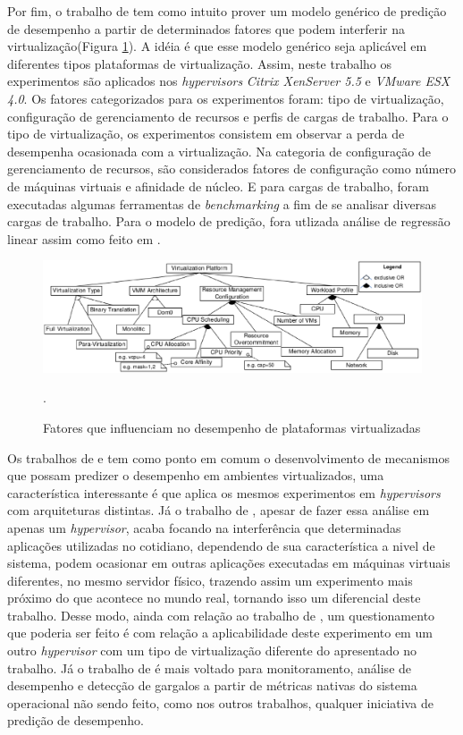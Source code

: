Por fim, o trabalho de  tem como intuito prover um modelo genérico de predição de desempenho a partir de determinados fatores que podem interferir na virtualização(Figura \ref{influence_factors}). A idéia é que esse modelo genérico seja aplicável em diferentes tipos plataformas de virtualização. Assim, neste trabalho os experimentos são aplicados nos \textit{hypervisors } \textit{Citrix XenServer 5.5} e \textit{VMware ESX 4.0}. Os fatores categorizados para os experimentos foram: tipo de virtualização, configuração de gerenciamento de recursos e perfis de cargas de trabalho. Para o tipo de virtualização, os experimentos consistem em observar a perda de desempenha ocasionada com a virtualização. Na categoria de configuração de gerenciamento de recursos, são considerados fatores de configuração como número de máquinas virtuais e afinidade de núcleo. E para cargas de trabalho, foram executadas algumas ferramentas de \textit{benchmarking} a fim de se analisar diversas cargas de trabalho. Para o modelo de predição, fora utlizada análise de regressão linear assim como feito em .

\begin{figure}[!htb]
\centering
\includegraphics [keepaspectratio=true,scale=0.50]{figuras/factors_influence.eps}
\caption{Fatores que influenciam no desempenho de plataformas virtualizadas}
\cite{huber2011}.
\label{influence_factors}
\end{figure} 

Os trabalhos de  e  tem como ponto em comum o desenvolvimento de mecanismos que possam predizer o desempenho em ambientes virtualizados, uma característica interessante é que  aplica os mesmos experimentos em \textit{hypervisors} com arquiteturas distintas. Já o trabalho de  , apesar de fazer essa análise em apenas um \textit{hypervisor}, acaba focando na interferência que determinadas aplicações utilizadas no cotidiano, dependendo de sua característica a nivel de sistema, podem ocasionar em outras aplicações executadas em máquinas virtuais diferentes, no mesmo servidor físico,  trazendo assim um experimento mais próximo do que acontece no mundo real, tornando isso um diferencial deste trabalho. Desse modo, ainda com relação ao trabalho de , um questionamento que poderia ser feito é com relação a aplicabilidade deste experimento em um outro \textit{hypervisor} com um tipo de virtualização diferente do apresentado no trabalho. Já o trabalho de  é mais voltado para monitoramento, análise de desempenho e detecção de gargalos a partir de métricas nativas do sistema operacional não sendo feito, como nos outros trabalhos, qualquer iniciativa de predição de desempenho.

